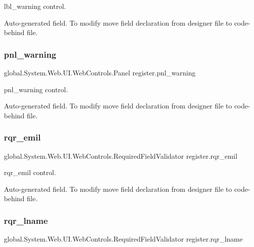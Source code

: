 lbl\+\_\+warning control. 

Auto-\/generated field. To modify move field declaration from designer file to code-\/behind file. \mbox{\label{classregister_acaddf0eba66a6f81ad53750801f90d21}} 
\subsubsection{\texorpdfstring{pnl\_warning}{pnl\_warning}}
{\footnotesize\ttfamily global.\+System.\+Web.\+U\+I.\+Web\+Controls.\+Panel register.\+pnl\+\_\+warning\hspace{0.3cm}{\ttfamily [protected]}}



pnl\+\_\+warning control. 

Auto-\/generated field. To modify move field declaration from designer file to code-\/behind file. \mbox{\label{classregister_a369170eced8c5009ee3e57ce34cf4a3a}} 
\subsubsection{\texorpdfstring{rqr\_emil}{rqr\_emil}}
{\footnotesize\ttfamily global.\+System.\+Web.\+U\+I.\+Web\+Controls.\+Required\+Field\+Validator register.\+rqr\+\_\+emil\hspace{0.3cm}{\ttfamily [protected]}}



rqr\+\_\+emil control. 

Auto-\/generated field. To modify move field declaration from designer file to code-\/behind file. \mbox{\label{classregister_a769c15be2d67d5b9248aac718d9cc08a}} 
\subsubsection{\texorpdfstring{rqr\_lname}{rqr\_lname}}
{\footnotesize\ttfamily global.\+System.\+Web.\+U\+I.\+Web\+Controls.\+Required\+Field\+Validator register.\+rqr\+\_\+lname\hspace{0.3cm}{\ttfamily [protected]}}



